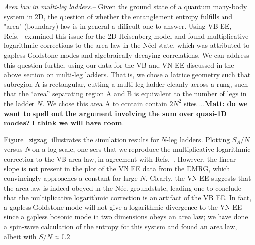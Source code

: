 \documentclass[prl,aps,twocolumn,floatfix,amsmath,amssymb,superscriptaddress,tightenlines]{revtex4}
\begin{document}
{\it Area law in multi-leg ladders.}--  
Given the ground state of a
quantum many-body system in 2D, the question of whether the entanglement
entropy fulfills and "area" (boundary) law is in general a difficult one
to answer.  
Using VB EE, Refs.~\cite{Alet,Chh} examined this issue for the 2D Heisenberg model and found
multiplicative logarithmic corrections to the area law in the N\'eel
state, which was attributed to gapless Goldstone modes and
algebraically decaying correlations.  
We can address this question further using our data for the VB and VN EE discussed 
in the above section on multi-leg ladders.  That is, we chose a lattice
geometry such that subregion A is rectangular, cutting a multi-leg ladder
cleanly across a rung, such that the ``area'' separating region A and B is
equivalent to the number of legs in the ladder $N$.  We chose this area A
to contain contain $2N^2$ sites ...{\bf Matt: do we want to spell out the
argument involving the sum over quasi-1D modes?  I think we will have
room}.

Figure~\ref{zigzag} illustrates the simulation results for $N$-leg ladders.
Plotting $S_A/N$ versus $N$ on a log scale, one sees that we reproduce the
multiplicative logarithmic correction to the VB area-law, in agreement
with Refs.~\cite{Alet,Chh}.  However, the linear slope is not present in
the plot of the VN EE data from the DMRG, which convincingly approaches a
constant for large $N$.  Clearly, the VN EE suggests that the area law is
indeed obeyed in the N\'eel groundstate, leading one to conclude that the
multiplicative logarithmic correction is an artifact of the VB EE.
In fact, a gapless Goldstone mode will not give a logarithmic
divergence to the VN EE since a gapless bosonic mode in two dimensions
obeys an area law\cite{2dboson}; we have done a spin-wave calculation of
the entropy for this system and found an area law, albeit with
$S/N\approx 0.2$

\end{document}
